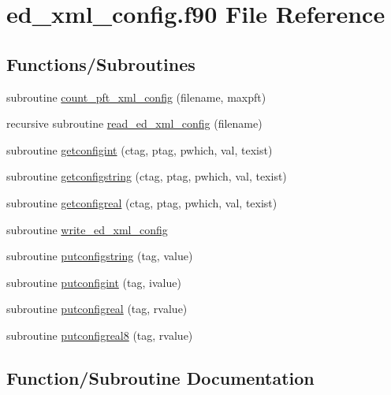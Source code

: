 \hypertarget{ed__xml__config_8f90}{}\section{ed\+\_\+xml\+\_\+config.\+f90 File Reference}
\label{ed__xml__config_8f90}
\subsection*{Functions/\+Subroutines}
\begin{DoxyCompactItemize}
\item 
subroutine \hyperlink{ed__xml__config_8f90_a86b17f0ea1e5298fb9d4747819cf4f10}{count\+\_\+pft\+\_\+xml\+\_\+config} (filename, maxpft)
\item 
recursive subroutine \hyperlink{ed__xml__config_8f90_accb60513f4c46e691fcd1f96c1e9df36}{read\+\_\+ed\+\_\+xml\+\_\+config} (filename)
\item 
subroutine \hyperlink{ed__xml__config_8f90_a949b85c800477675f7d27e9e02d2d501}{getconfigint} (ctag, ptag, pwhich, val, texist)
\item 
subroutine \hyperlink{ed__xml__config_8f90_af0adc799495cd223935aceec004ccb11}{getconfigstring} (ctag, ptag, pwhich, val, texist)
\item 
subroutine \hyperlink{ed__xml__config_8f90_a954b3037e7eb894975c79fed7627dfb0}{getconfigreal} (ctag, ptag, pwhich, val, texist)
\item 
subroutine \hyperlink{ed__xml__config_8f90_adac334da78b1efa5c92f7caf53e2d855}{write\+\_\+ed\+\_\+xml\+\_\+config}
\item 
subroutine \hyperlink{ed__xml__config_8f90_aac9f776b36e63aa8454d3841e3fda182}{putconfigstring} (tag, value)
\item 
subroutine \hyperlink{ed__xml__config_8f90_a026dfa9d8dcef5376fdabe6f581cc5e6}{putconfigint} (tag, ivalue)
\item 
subroutine \hyperlink{ed__xml__config_8f90_aefca40b018b8204a43d2c6822a83dee9}{putconfigreal} (tag, rvalue)
\item 
subroutine \hyperlink{ed__xml__config_8f90_ad862c7defff292e3810aa4ee8a730a35}{putconfigreal8} (tag, rvalue)
\end{DoxyCompactItemize}


\subsection{Function/\+Subroutine Documentation}
\mbox{\label{ed__xml__config_8f90_a86b17f0ea1e5298fb9d4747819cf4f10}} 
